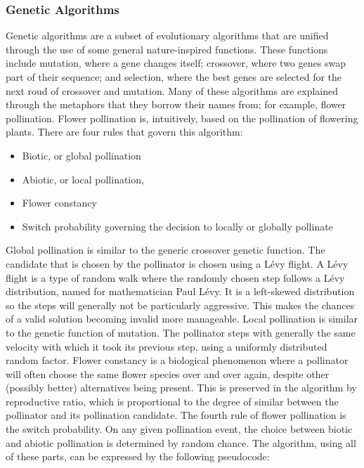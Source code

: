 \documentclass{article}
\begin{document}
    \subsubsection{Genetic Algorithms}
    Genetic algorithms are a subset of evolutionary algorithms that are unified through the use of some general nature-inspired functions. These
    functions include mutation, where a gene changes itself; crossover, where two genes swap part of their sequence; and selection, where the 
    best genes are selected for the next roud of crossover and mutation. Many of these algorithms are explained through the metaphors that they 
    borrow their names from; for example, flower pollination. Flower pollination is, intuitively, based on the pollination of flowering plants. 
    There are four rules that govern this algorithm:
    \begin{itemize}
        \item Biotic, or global pollination
        \item Abiotic, or local pollination, 
        \item Flower constancy
        \item Switch probability governing the decision to locally or globally pollinate
    \end{itemize}
    Global pollination is similar to the generic crossover genetic function. The candidate that is chosen by the pollinator is chosen using 
    a L\'evy flight. A L\'evy flight is a type of random walk where the randomly chosen step follows a L\'evy distribution, named for 
    mathematician Paul L\'evy. It is a left-skewed distribution so the steps will generally not be particularly aggressive. This makes the 
    chances of a valid solution becoming invalid more manageable. 
    Local pollination is similar to the genetic function of mutation. The pollinator steps with generally the same velocity with which it 
    took its previous step, using a uniformly distributed random factor.
    Flower constancy is a biological phenomenon where a pollinator will often choose the same flower species over and over again, despite 
    other (possibly better) alternatives being present. This is preserved in the algorithm by reproductive ratio, which is proportional
    to the degree of similar between the pollinator and its pollination candidate. 
    The fourth rule of flower pollination is the switch probability. On any given pollination event, the choice between biotic and abiotic
    pollination is determined by random chance. The algorithm, using all of these parts, can be expressed by the following pseudocode:
\end{document}
